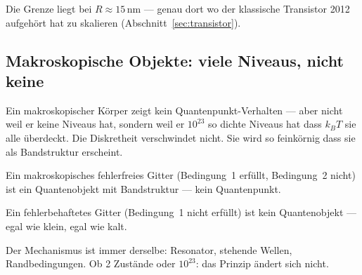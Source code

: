 \begin{center}
\end{center}

Die Grenze liegt bei $R \approx 15$\,nm --- genau dort
wo der klassische Transistor 2012 aufgehört hat zu skalieren
(Abschnitt~\ref{sec:transistor}).

\subsection{Makroskopische Objekte: viele Niveaus, nicht keine}

Ein makroskopischer Körper zeigt kein Quantenpunkt-Verhalten ---
aber nicht weil er keine Niveaus hat, sondern weil er
$10^{23}$ so dichte Niveaus hat dass $k_BT$ sie alle überdeckt.
Die Diskretheit verschwindet nicht. Sie wird so feinkörnig
dass sie als Bandstruktur erscheint.

\begin{keypoint}
Ein makroskopisches fehlerfreies Gitter (Bedingung~1 erfüllt,
Bedingung~2 nicht) ist ein Quantenobjekt mit Bandstruktur ---
kein Quantenpunkt.

Ein fehlerbehaftetes Gitter (Bedingung~1 nicht erfüllt)
ist kein Quantenobjekt --- egal wie klein, egal wie kalt.

Der Mechanismus ist immer derselbe: Resonator, stehende Wellen,
Randbedingungen. Ob 2 Zustände oder $10^{23}$: das Prinzip
ändert sich nicht.
\end{keypoint}


